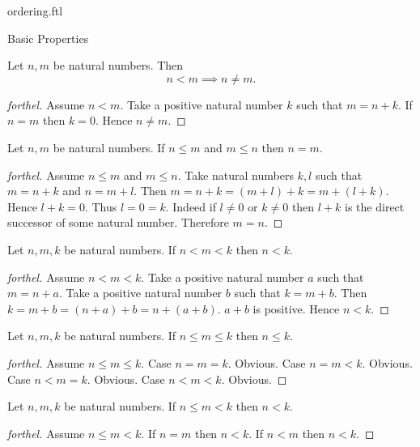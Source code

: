 \documentclass{naproche-library}
\begin{document}
\begin{smodule}[title=The Standard Ordering of the Natural Numbers]{ordering.ftl}
\begin{sfragment}{Basic Properties}
  \begin{proposition}[forthel,id=ARITHMETIC_04_8266284905005056]
    Let $n, m$ be natural numbers.
    Then \[ n < m \implies n \neq m. \]
  \end{proposition}
  \begin{proof}[forthel]
    Assume $n < m$.
    Take a positive natural number $k$ such that $m = n + k$.
    If $n = m$ then $k = 0$.
    Hence $n \neq m$.
  \end{proof}

  \begin{proposition}[forthel,id=ARITHMETIC_04_4190604718243840]
    Let $n, m$ be natural numbers.
    If $n \leq m$ and $m \leq n$ then $n = m$.
  \end{proposition}
  \begin{proof}[forthel]
    Assume $n \leq m$ and $m \leq n$.
    Take natural numbers $k, l$ such that $m = n + k$ and $n = m + l$.
    Then $m
      = n + k
      = (m + l) + k
      = m + (l + k)$.
    Hence $l + k = 0$.
    Thus $l = 0 = k$.
    Indeed if $l \neq 0$ or $k \neq 0$ then $l + k$ is the direct successor of
    some natural number.
    Therefore $m = n$.
  \end{proof}

  \begin{proposition}[forthel,id=ARITHMETIC_04_6413905244979200]
    Let $n, m, k$ be natural numbers.
    If $n < m < k$ then $n < k$.
  \end{proposition}
  \begin{proof}[forthel]
    Assume $n < m < k$.
    Take a positive natural number $a$ such that $m = n + a$.
    Take a positive natural number $b$ such that $k = m + b$.
    Then $k
      = m + b
      = (n + a) + b
      = n + (a + b)$.
    $a + b$ is positive.
    Hence $n < k$.
  \end{proof}

  \begin{proposition}[forthel,id=ARITHMETIC_04_5480385953660928]
    Let $n, m, k$ be natural numbers.
    If $n \leq m \leq k$ then $n \leq k$.
  \end{proposition}
  \begin{proof}[forthel]
    Assume $n \leq m \leq k$.
    Case $n = m = k$. Obvious.
    Case $n = m < k$. Obvious.
    Case $n < m = k$. Obvious.
    Case $n < m < k$. Obvious.
  \end{proof}

  \begin{proposition}[forthel,id=ARITHMETIC_04_5098403656630272]
    Let $n, m, k$ be natural numbers.
    If $n \leq m < k$ then $n < k$.
  \end{proposition}
  \begin{proof}[forthel]
    Assume $n \leq m < k$.
    If $n = m$ then $n < k$.
    If $n < m$ then $n < k$.
  \end{proof}


\end{sfragment}
\end{smodule}
\end{document}
